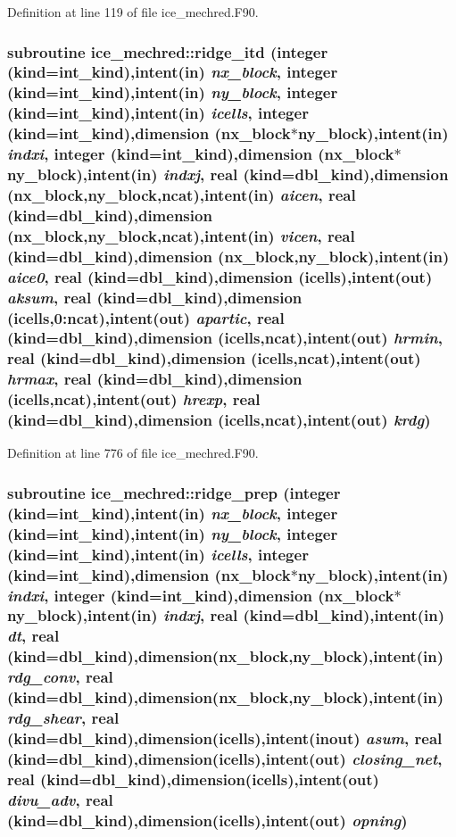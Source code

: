 Definition at line 119 of file ice\_\-mechred.F90.\hypertarget{namespaceice__mechred_aa337d7f3df7eb6c6f9e3724e2d350e0c}{
\subsubsection[{ridge\_\-itd}]{\setlength{\rightskip}{0pt plus 5cm}subroutine ice\_\-mechred::ridge\_\-itd (integer (kind=int\_\-kind),intent(in) {\em nx\_\-block}, \/  integer (kind=int\_\-kind),intent(in) {\em ny\_\-block}, \/  integer (kind=int\_\-kind),intent(in) {\em icells}, \/  integer (kind=int\_\-kind),dimension (nx\_\-block$\ast$ny\_\-block),intent(in) {\em indxi}, \/  integer (kind=int\_\-kind),dimension (nx\_\-block$\ast$ny\_\-block),intent(in) {\em indxj}, \/  real (kind=dbl\_\-kind),dimension (nx\_\-block,ny\_\-block,ncat),intent(in) {\em aicen}, \/  real (kind=dbl\_\-kind),dimension (nx\_\-block,ny\_\-block,ncat),intent(in) {\em vicen}, \/  real (kind=dbl\_\-kind),dimension (nx\_\-block,ny\_\-block),intent(in) {\em aice0}, \/  real (kind=dbl\_\-kind),dimension (icells),intent(out) {\em aksum}, \/  real (kind=dbl\_\-kind),dimension (icells,0:ncat),intent(out) {\em apartic}, \/  real (kind=dbl\_\-kind),dimension (icells,ncat),intent(out) {\em hrmin}, \/  real (kind=dbl\_\-kind),dimension (icells,ncat),intent(out) {\em hrmax}, \/  real (kind=dbl\_\-kind),dimension (icells,ncat),intent(out) {\em hrexp}, \/  real (kind=dbl\_\-kind),dimension (icells,ncat),intent(out) {\em krdg})}}
\label{namespaceice__mechred_aa337d7f3df7eb6c6f9e3724e2d350e0c}


Definition at line 776 of file ice\_\-mechred.F90.\hypertarget{namespaceice__mechred_a387bb4361bc395e2cc8d9ab50ef03728}{
\subsubsection[{ridge\_\-prep}]{\setlength{\rightskip}{0pt plus 5cm}subroutine ice\_\-mechred::ridge\_\-prep (integer (kind=int\_\-kind),intent(in) {\em nx\_\-block}, \/  integer (kind=int\_\-kind),intent(in) {\em ny\_\-block}, \/  integer (kind=int\_\-kind),intent(in) {\em icells}, \/  integer (kind=int\_\-kind),dimension (nx\_\-block$\ast$ny\_\-block),intent(in) {\em indxi}, \/  integer (kind=int\_\-kind),dimension (nx\_\-block$\ast$ny\_\-block),intent(in) {\em indxj}, \/  real (kind=dbl\_\-kind),intent(in) {\em dt}, \/  real (kind=dbl\_\-kind),dimension(nx\_\-block,ny\_\-block),intent(in) {\em rdg\_\-conv}, \/  real (kind=dbl\_\-kind),dimension(nx\_\-block,ny\_\-block),intent(in) {\em rdg\_\-shear}, \/  real (kind=dbl\_\-kind),dimension(icells),intent(inout) {\em asum}, \/  real (kind=dbl\_\-kind),dimension(icells),intent(out) {\em closing\_\-net}, \/  real (kind=dbl\_\-kind),dimension(icells),intent(out) {\em divu\_\-adv}, \/  real (kind=dbl\_\-kind),dimension(icells),intent(out) {\em opning})}}
\label{namespaceice__mechred_a387bb4361bc395e2cc8d9ab50ef03728}



